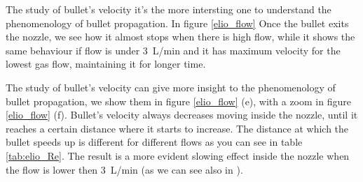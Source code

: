 The study of bullet's velocity it's the more intersting one to understand the phenomenology of bullet propagation. In figure \ref{elio_flow}
Once the bullet exits the nozzle, we see how it almost stops when there is high flow, while it shows the same behaviour if flow is under \SI{3}{\liter/\minute} and it has maximum velocity for the lowest gas flow, maintaining it for longer time.

The study of bullet's velocity can give more insight to the phenomenology of bullet propagation, we show them in figure \ref{elio_flow} (e), with a zoom in figure \ref{elio_flow} (f). Bullet's velocity always decreases moving inside the nozzle, until it reaches a certain distance where it starts to increase. The distance at which the bullet speeds up is different for different flows as you can see in table \ref{tab:elio_Re}. The result is a more evident slowing effect inside the nozzle when the flow is lower then \SI{3}{\liter/\minute} (as we can see also in \cite{Jarrige_2010}).

